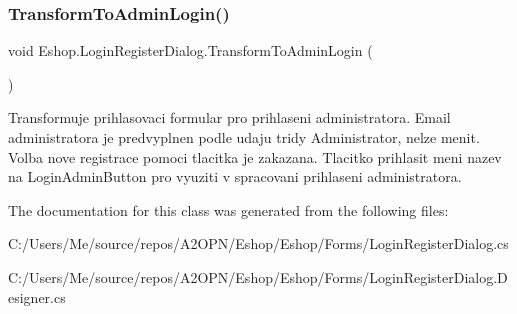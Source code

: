 \subsubsection{\texorpdfstring{TransformToAdminLogin()}{TransformToAdminLogin()}}
{\footnotesize\ttfamily void Eshop.\+Login\+Register\+Dialog.\+Transform\+To\+Admin\+Login (\begin{DoxyParamCaption}{ }\end{DoxyParamCaption})}



Transformuje prihlasovaci formular pro prihlaseni administratora. Email administratora je predvyplnen podle udaju tridy Administrator, nelze menit. Volba nove registrace pomoci tlacitka je zakazana. Tlacitko prihlasit meni nazev na Login\+Admin\+Button pro vyuziti v spracovani prihlaseni administratora. 



The documentation for this class was generated from the following files\+:\begin{DoxyCompactItemize}
\item 
C\+:/\+Users/\+Me/source/repos/\+A2\+O\+P\+N/\+Eshop/\+Eshop/\+Forms/Login\+Register\+Dialog.\+cs\item 
C\+:/\+Users/\+Me/source/repos/\+A2\+O\+P\+N/\+Eshop/\+Eshop/\+Forms/Login\+Register\+Dialog.\+Designer.\+cs\end{DoxyCompactItemize}
